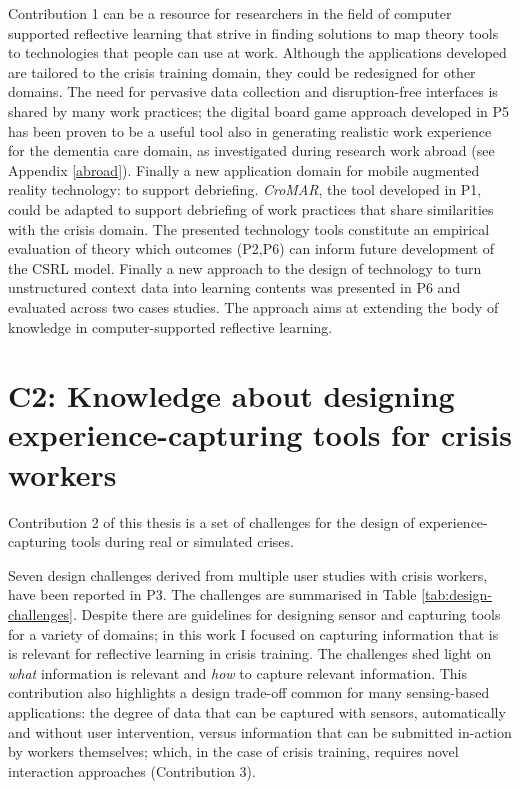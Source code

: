Contribution 1 can be a resource for researchers in the field of computer supported reflective learning that strive in finding solutions to map theory tools to technologies that people can use at work. Although the applications developed are tailored to the crisis training domain, they could be redesigned for other domains. The need for pervasive data collection and disruption-free interfaces is shared by many work practices; the digital board game approach developed in P5 has been proven to be a useful tool also in generating realistic work experience for the dementia care domain, as investigated during research work abroad (see Appendix \ref{abroad}). Finally a new application domain for mobile augmented reality technology: to support debriefing. \emph{CroMAR}, the tool developed in P1, could be adapted to support debriefing of work practices that share similarities with the crisis domain. The presented technology tools constitute an empirical evaluation of theory which outcomes (P2,P6) can inform future development of the CSRL model. Finally a new approach to the design of technology to turn unstructured context data into learning contents was presented in P6 and evaluated across two cases studies. The approach aims at extending the body of knowledge in computer-supported reflective learning.

\section{C2: Knowledge about designing experience-capturing tools for crisis workers}\label{c2-knowledge-about-designing-experience-capturing-tools-for-crisis-workers}

Contribution 2 of this thesis is a set of challenges for the design of experience-capturing tools during real or simulated crises.

Seven design challenges derived from multiple user studies with crisis workers, have been reported in P3. The challenges are summarised in Table \ref{tab:design-challenges}. Despite there are guidelines for designing sensor and capturing tools for a variety of domains; in this work I focused on capturing information that is is relevant for reflective learning in crisis training. The challenges shed light on \emph{what} information is relevant and \emph{how} to capture relevant information. This contribution also highlights a design trade-off common for many sensing-based applications: the degree of data that can be captured with sensors, automatically and without user intervention, versus information that can be submitted in-action by workers themselves; which, in the case of crisis training, requires novel interaction approaches (Contribution 3). 

